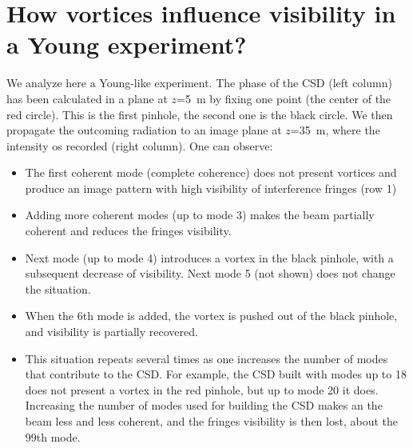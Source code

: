 \documentclass[a4paper,10pt]{article}
\begin{document}
 
 \section{How vortices influence visibility in a Young experiment?}

We analyze here a Young-like experiment. The phase of the CSD (left column) has been calculated in a plane at $z$=5~m by fixing one point (the center of the red circle). This is the first pinhole, the second one is the black circle. We then propagate the outcoming radiation to an image plane at $z$=35~m, where the intensity os recorded (right column). One can observe: 

\begin{itemize}
\item The first coherent mode (complete coherence) does not present vortices and produce an image pattern with high visibility of interference fringes (row 1)
\item Adding more coherent modes (up to mode 3) makes the beam partially coherent and reduces the fringes visibility. 
\item Next mode (up to mode 4) introduces a vortex in the black pinhole, with a subsequent decrease of visibility. Next mode 5 (not shown) does not change the situation. 
\item When the 6th mode is added, the vortex is pushed out of the black pinhole, and visibility is partially recovered. 
\item This situation repeats several times as one increases the number of modes that contribute to the CSD. For example, the CSD built with modes up to 18 does not present a vortex in the red pinhole, but up to mode 20 it does. Increasing the number of modes used for building the CSD makes an the beam less and less coherent, and the fringes visibility is then lost, about the 99th mode.

\end{itemize}
\end{document}
